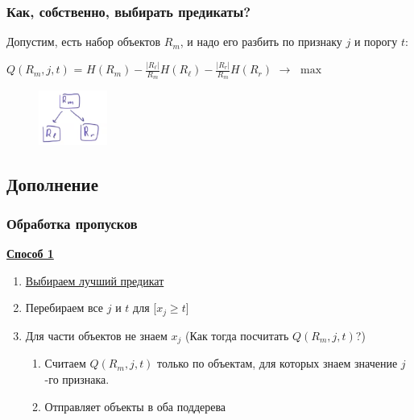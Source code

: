                     
                \subsubsection{Как, собственно, выбирать предикаты?}

                  Допустим, есть набор объектов $R_m$, и надо его разбить по признаку $j$ и порогу $t$:
                  \begin{center}
                      $Q(R_m, j, t)$ = $H(R_m) - \frac{|R_\ell|}{R_m}H(R_\ell) - \frac{|R_r|}{R_m}H(R_r)$ $\longrightarrow$ $\max$
                  \end{center}

                  \begin{figure}[H]
                    \centering
                    \includegraphics[width=0.2\textwidth]{images/8lecture/predicat_choose.png}
                \end{figure}


    \subsection{Дополнение}

        \subsubsection{Обработка пропусков}

            \underline{\textbf{Способ 1}}
            \begin{enumerate}
                \item \underline{Выбираем лучший предикат} 
                \item Перебираем все $j$ и $t$ для [$x_j \geq t$]
                \item Для части объектов не знаем $x_j$ (Как тогда посчитать $Q(R_m, j, t)$?)
                \begin{enumerate}
                    \item Считаем $Q(R_m, j, t)$ только по объектам, для которых знаем значение $j$-го признака.
                    \item Отправляет объекты в оба поддерева
                \end{enumerate}
            \end{enumerate}

